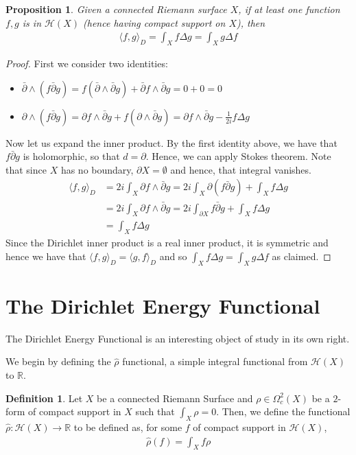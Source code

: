 \documentclass[a4paper,12pt]{report}
\theoremstyle{plain}
\newtheorem{prop}[thm]{Proposition}
\theoremstyle{definition}
\newtheorem{defn}[thm]{Definition}
\begin{document}
\begin{prop}\label{InnerLaplacian}
  Given a connected Riemann surface $X$, if at least one function $f,g$ is in $\mathcal{H}(X)$ (hence having compact support on $X$), then 
  \begin{align*}
    \langle f, g \rangle_D = \int_X f \Delta g = \int_X g \Delta f
  \end{align*}
\end{prop}
\begin{proof}
  First we consider two identities:
  \begin{itemize}
    \item $\bar{\partial}\wedge(f\bar{\partial}g) = f (\bar{\partial}\wedge\bar{\partial} g) + \bar{\partial}f \wedge \bar{\partial}g = 0 + 0 = 0$
    \item $\partial\wedge(f\bar{\partial}g)=\partial f \wedge \bar{\partial}g + f(\partial\wedge\bar{\partial}g)=\partial f \wedge \bar{\partial}g - \frac{1}{2i}f\Delta g$
  \end{itemize}
  Now let us expand the inner product. By the first identity above, we have that $f\bar{\partial}g$ is holomorphic, so that $d = \partial$. Hence, we can apply Stokes theorem. Note that since $X$ has no boundary, $\partial X = \emptyset$ and hence, that integral vanishes.
  \begin{align*}
    \langle f, g \rangle_D &= 2i\int_X \partial f \wedge \bar{\partial}g = 2i\int_X \partial(f\bar{\partial}g)+\int_X f\Delta g \\
    &= 2i\int_X \partial f \wedge \bar{\partial}g = 2i\int_{\partial X} f\bar{\partial}g + \int_X f\Delta g \\
    &= \int_X f\Delta g
  \end{align*}
  Since the Dirichlet inner product is a real inner product, it is symmetric and hence we have that $\langle f, g \rangle_D = \langle g, f \rangle_D $ and so $\int_X f\Delta g = \int_X g \Delta f$ as claimed.
\end{proof}

\section{The Dirichlet Energy Functional}
The Dirichlet Energy Functional is an interesting object of study in its own right. 

We begin by defining the $\hat{\rho}$ functional, a simple integral functional from $\mathcal{H}(X)$ to $\mathbb{R}$.
\begin{defn}
  Let $X$ be a connected Riemann Surface and $\rho \in \Omega^2_c(X)$ be a $2$-form of compact support in $X$ such that $\int_X \rho = 0$. Then, we define the functional $\hat{\rho} \colon \mathcal{H}(X) \rightarrow \mathbb{R}$ to be defined as, for some $f$ of compact support in $\mathcal{H}(X)$,
  \begin{align*}
    \hat{\rho}(f) = \int_X f\rho
  \end{align*}
\end{defn}
\end{document}
